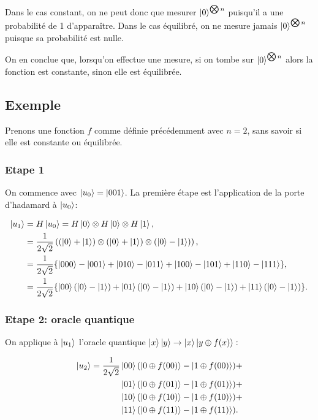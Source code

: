 Dans le cas constant, on ne peut donc que mesurer $\ket{0}^{\bigotimes n}$ puisqu'il a une probabilité de 1 d'apparaître. Dans le cas équilibré, on ne mesure jamais $\ket{0}^{\bigotimes n}$ puisque sa probabilité est nulle.

On en conclue que, lorsqu'on effectue une mesure, si on tombe sur $\ket{0}^{\bigotimes n}$ alors la fonction est constante, sinon elle est équilibrée.


\subsection{Exemple}

Prenons une fonction $f$ comme définie précédemment avec $n=2$, sans
savoir si elle est constante ou équilibrée.

\subsubsection{Etape 1}


On commence avec $\ket{u_0} = \ket{001}$. La première étape est
l'application de la porte d'hadamard à $\ket{u_0}$:

\begin{align}
\ket{u_1} &= H\ket{u_0} = H\ket{0} \otimes H\ket{0} \otimes H\ket{1} \nonumber ,\\
& = \frac{1}{2\sqrt{2}} \left( (\ket{0} + \ket{1})\otimes(\ket{0} + \ket{1})\otimes(\ket{0} - \ket{1}) \right) \nonumber ,\\
 & = \frac{1}{2\sqrt{2}}\{\ket{000} - \ket{001} + \ket{010} - \ket{011} + \ket{100} - \ket{101} + \ket{110} - \ket{111}\} \nonumber ,\\
& = \frac{1}{2\sqrt{2}}\{\ket{00}(\ket{0} - \ket{1}) + \ket{01}(\ket{0} - \ket{1}) + \ket{10}(\ket{0} - \ket{1}) + \ket{11}(\ket{0} - \ket{1})\} .
\end{align}


\subsubsection{Etape 2: oracle quantique}

On applique à $\ket{u_1}$ l'oracle quantique $\ket{x}\ket{y}\rightarrow\ket{x}\ket{y\oplus f(x)}:$

\begin{align*}
\ket{u_2}  =  \frac{1}{2\sqrt{2}}  & \ket{00}(\ket{0 \oplus f(00)} - \ket{1 \oplus f(00)}) + \\
& \ket{01}(\ket{0 \oplus f(01)} - \ket{1 \oplus f(01)}) + \\
& \ket{10}(\ket{0 \oplus f(10)} - \ket{1 \oplus f(10)}) + \\
& \ket{11}(\ket{0 \oplus f(11)} - \ket{1 \oplus f(11)}).
\end{align*}


